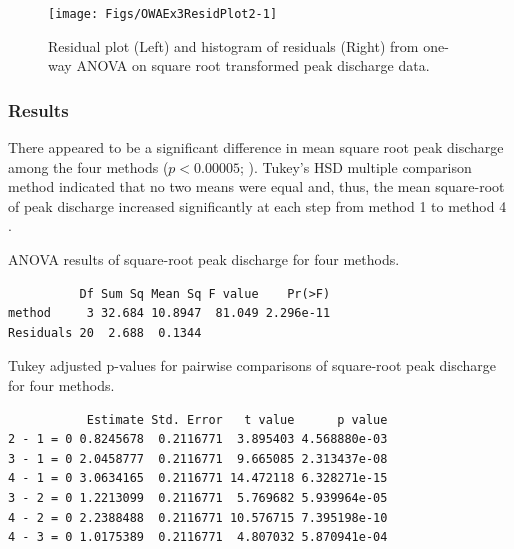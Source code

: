 \documentclass[10pt,openany]{book}\usepackage[]{graphicx}\usepackage[]{color}
\makeatletter
\newenvironment{kframe}{%
 \def\at@end@of@kframe{}%
 \ifinner\ifhmode%
  \def\at@end@of@kframe{\end{minipage}}%
  \begin{minipage}{\columnwidth}%
 \fi\fi%
 \def\FrameCommand##1{\hskip\@totalleftmargin \hskip-\fboxsep
 \colorbox{shadecolor}{##1}\hskip-\fboxsep
     \hskip-\linewidth \hskip-\@totalleftmargin \hskip\columnwidth}%
 \MakeFramed {\advance\hsize-\width
   \@totalleftmargin\z@ \linewidth\hsize
   \@setminipage}}%
 {\par\unskip\endMakeFramed%
 \at@end@of@kframe}
\newenvironment{knitrout}{}{} %
\makeatother
\begin{document}
\begin{knitrout}
\color{fgcolor}\begin{figure}[hbtp]

{\centering \texttt{[image: Figs/OWAEx3ResidPlot2-1]} 

}

\caption[Residual plot (Left) and histogram of residuals (Right) from one-way ANOVA on square root transformed peak discharge data]{Residual plot (Left) and histogram of residuals (Right) from one-way ANOVA on square root transformed peak discharge data.}\label{fig:OWAEx3ResidPlot2}
\end{figure}


\end{knitrout}

\subsubsection*{Results}
There appeared to be a significant difference in mean square root peak discharge among the four methods ($p<0.00005$; ).  Tukey's HSD multiple comparison method indicated that no two means were equal  and, thus, the mean square-root of peak discharge increased significantly at each step from method 1 to  method 4 .

\begin{table}[h]
  \centering
  \caption{ANOVA results of square-root peak discharge for four methods.}\label{tab:OWAEx3Results1}
\begin{knitrout}
\color{fgcolor}\begin{kframe}
\begin{verbatim}
          Df Sum Sq Mean Sq F value    Pr(>F)
method     3 32.684 10.8947  81.049 2.296e-11
Residuals 20  2.688  0.1344                  
\end{verbatim}
\end{kframe}
\end{knitrout}
\end{table}

\begin{table}[h]
  \centering
  \caption{Tukey adjusted p-values for pairwise comparisons of square-root peak discharge for four methods.}\label{tab:OWAEx3Results2}
\begin{knitrout}
\color{fgcolor}\begin{kframe}
\begin{verbatim}
           Estimate Std. Error   t value      p value
2 - 1 = 0 0.8245678  0.2116771  3.895403 4.568880e-03
3 - 1 = 0 2.0458777  0.2116771  9.665085 2.313437e-08
4 - 1 = 0 3.0634165  0.2116771 14.472118 6.328271e-15
3 - 2 = 0 1.2213099  0.2116771  5.769682 5.939964e-05
4 - 2 = 0 2.2388488  0.2116771 10.576715 7.395198e-10
4 - 3 = 0 1.0175389  0.2116771  4.807032 5.870941e-04
\end{verbatim}
\end{kframe}
\end{knitrout}
\end{table}
\end{document}
